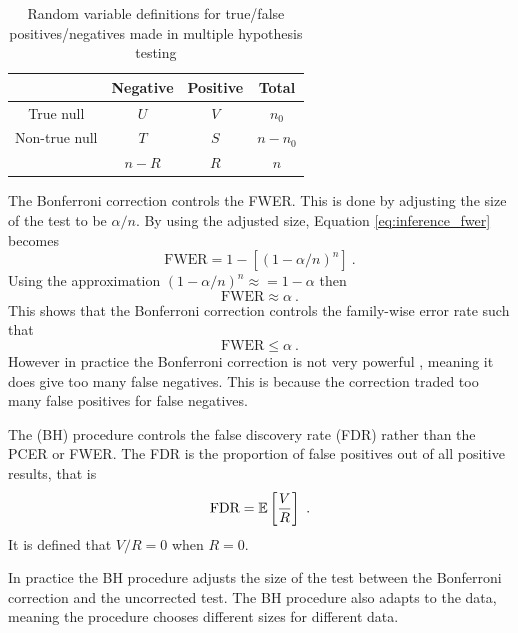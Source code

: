\begin{table}
    \centering
    \begin{tabular}{c|c|c|c}
        &Negative&Positive&Total\\\hline
        True null & $U$ & $V$ & $n_0$\\
        Non-true null & $T$ & $S$ & $n-n_0$\\\hline
        &$n-R$&$R$&$n$
    \end{tabular}
    \caption{Random variable definitions for true/false positives/negatives made in multiple hypothesis testing}
    \label{table:inference_randomvariables}
\end{table}

The Bonferroni correction \citep{shaffer1995multiple, bland1995multiple, perneger1998what} controls the FWER. This is done by adjusting the size of the test to be $\alpha/n$. By using the adjusted size, Equation \eqref{eq:inference_fwer} becomes
\begin{equation}
    \text{FWER}=1-\left[(1-\alpha/n)^n\right]\ .
\end{equation}
Using the approximation $(1-\alpha/n)^n\approx = 1-\alpha$ then
\begin{equation}
    \text{FWER}\approx \alpha \ .
\end{equation}
This shows that the Bonferroni correction controls the family-wise error rate such that
\begin{equation}
    \text{FWER} \leqslant \alpha \ .
\end{equation}
However in practice the Bonferroni correction is not very powerful \citep{perneger1998what}, meaning it does give too many false negatives. This is because the correction traded too many false positives for false negatives.

The \cite{benjamini1995controlling} (BH) procedure controls the false discovery rate (FDR) \citep{benjamini2010discovering} rather than the PCER or FWER. The FDR is the proportion of false positives out of all positive results, that is
\begin{equation}
    \text{FDR} = \operatorname{\mathbb{E}}\left[
        \dfrac{V}{R}
    \right]
    \ .
\end{equation}
It is defined that $V/R=0$ when $R=0$.

In practice the BH procedure adjusts the size of the test between the Bonferroni correction and the uncorrected test. The BH procedure also adapts to the data, meaning the procedure chooses different sizes for different data.

